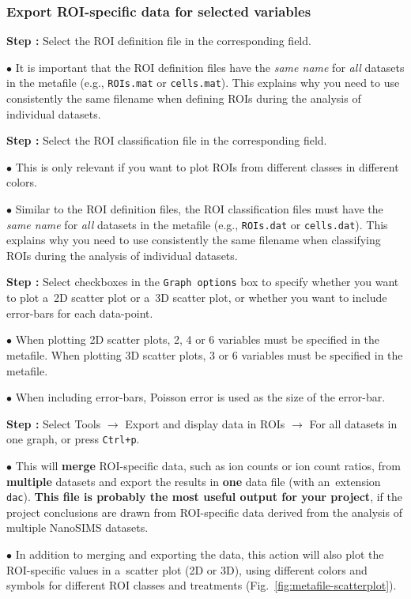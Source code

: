 \documentclass[a4paper, 11pt]{article}
\newcommand{\ttt}[1]{\texttt{#1}}
\newcommand{\lans}[1]{{\color{magenta}#1}}
\newcommand{\lanscb}[1]{{\color{darkgreen}#1}}
\newcommand{\lanstf}[1]{{\color{cyan}#1}}
\newcommand\ra{\rightarrow}
\newcounter{step}
\newcommand\s{\addtocounter{step}{1}\vskip5pt\noindent\textbf{Step \thestep:}{ }}
\newcommand\bul{\vskip5pt\noindent$\bullet${ }}
\newcommand\bb[1]{\textbf{#1}}
\begin{document}

\subsubsection{Export ROI-specific data for selected variables}
\label{sec:622}
\setcounter{step}{0}

\s Select the \lanstf{ROI definition file} in the corresponding field.

\bul It is important that the ROI definition files have the \emph{same name} for \emph{all} datasets in the metafile (e.g., \ttt{ROIs.mat} or \ttt{cells.mat}). This explains why you need to use consistently the same filename when defining ROIs during the analysis of individual datasets.

\s Select the \lanstf{ROI classification file} in the corresponding field.

\bul This is only relevant if you want to plot ROIs from different classes in different colors.

\bul Similar to the ROI definition files, the ROI classification files must have the \emph{same name} for \emph{all} datasets in the metafile (e.g., \ttt{ROIs.dat} or \ttt{cells.dat}). This explains why you need to use consistently the same filename when classifying ROIs during the analysis of individual datasets.

\s Select checkboxes in the \ttt{Graph options} box to specify whether you want to plot a~\lanscb{2D} scatter plot or a~\lanscb{3D} scatter plot, or whether you want to include \lanscb{error-bars} for each data-point. 

\bul When plotting 2D scatter plots, 2, 4 or 6 variables must be specified in the metafile. When plotting 3D scatter plots, 3 or 6 variables must be specified in the metafile. 

\bul When including error-bars, Poisson error is used as the size of the error-bar.

\s Select \lans{Tools} $\ra$ \lans{Export and display data in ROIs} $\ra$ \lans{For all datasets in one graph}, or press \ttt{Ctrl+p}.

\bul This will \bb{merge} ROI-specific data, such as ion counts or ion count ratios, from \bb{multiple} datasets and export the results in \bb{one} data file (with an~extension \ttt{dac}). \bb{This file is probably the most useful output for your project}, if the project conclusions are drawn from ROI-specific data derived from the analysis of multiple NanoSIMS datasets.

\bul In addition to merging and exporting the data, this action will also plot the ROI-specific values in a~scatter plot (2D or 3D), using different colors and symbols for different ROI classes and treatments (Fig.~\ref{fig:metafile-scatterplot}). 
\end{document}
